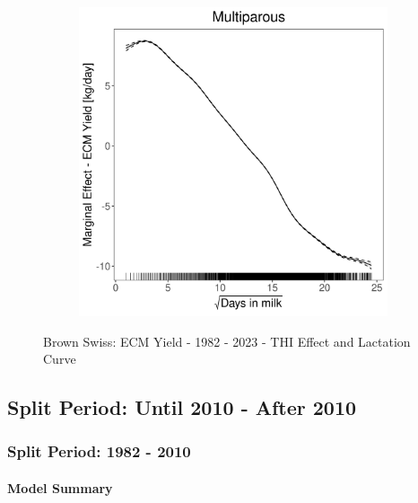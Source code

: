 \begin{figure}[H]
\begin{subfigure}[b]{0.45\textwidth}
    \end{subfigure}
    \hspace{0.05\textwidth} %
    \begin{subfigure}[b]{0.45\textwidth}
        \centering
        \includegraphics[width=\textwidth]{thesis/figures/models/ecm/full/bs_ecm_full/bs_ecm_full_marginal_dim_milk_multi.png}
    \end{subfigure}
    \caption[]{Brown Swiss: ECM Yield - 1982 - 2023 - THI Effect and Lactation Curve}
    \label{fig:main}
\end{figure}

\subsection{Split Period: Until 2010 - After 2010}
\subsubsection{Split Period: 1982 - 2010}\label{model:bs_ecm_before}

\paragraph{Model Summary} \quad \\

